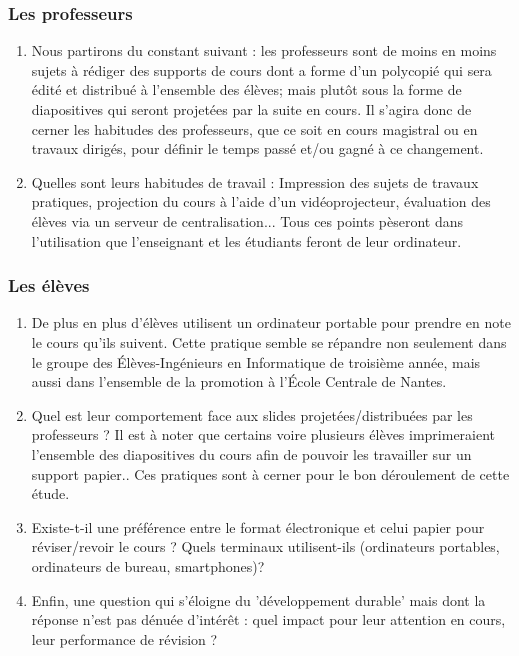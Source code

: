 \documentclass[a4paper,11pt,french]{report}
\begin{document}
\subsubsection{Les professeurs}
\begin{enumerate}
\item Nous partirons du constant suivant : les professeurs sont de moins en moins sujets à rédiger des supports de cours dont a forme d'un polycopié qui sera édité et distribué à l'ensemble des élèves; mais plutôt sous la forme de diapositives qui seront projetées par la suite en cours. Il s'agira donc de cerner les habitudes des professeurs, que ce soit en cours magistral ou en travaux dirigés, pour définir le temps passé et/ou gagné à ce changement.
\item Quelles sont leurs habitudes de travail : Impression des sujets de travaux pratiques, projection du cours à l'aide d'un vidéoprojecteur, évaluation des élèves via un serveur de centralisation... Tous ces points pèseront dans l'utilisation que l'enseignant et les étudiants feront de leur ordinateur.
\end{enumerate}


\subsubsection{Les élèves}
\begin{enumerate}
\item De plus en plus d'élèves utilisent un ordinateur portable pour prendre en note le cours qu'ils suivent. Cette pratique semble se répandre non seulement dans le groupe des Élèves-Ingénieurs en Informatique de troisième année, mais aussi dans l'ensemble de la promotion à l'École Centrale de Nantes.
\item Quel est leur comportement face aux slides projetées/distribuées par les professeurs ? Il est à noter que certains voire plusieurs élèves imprimeraient l'ensemble des diapositives du cours afin de pouvoir les travailler sur un support papier.. Ces pratiques sont à cerner pour le bon déroulement de cette étude.
\item Existe-t-il une préférence entre le format électronique et celui papier pour réviser/revoir le cours ? Quels terminaux utilisent-ils (ordinateurs portables, ordinateurs de bureau, smartphones)?
\item Enfin, une question qui s'éloigne du 'développement durable' mais dont la réponse n'est pas dénuée d'intérêt : quel impact pour leur attention en cours, leur performance de révision ?
\end{enumerate}
\end{document}
